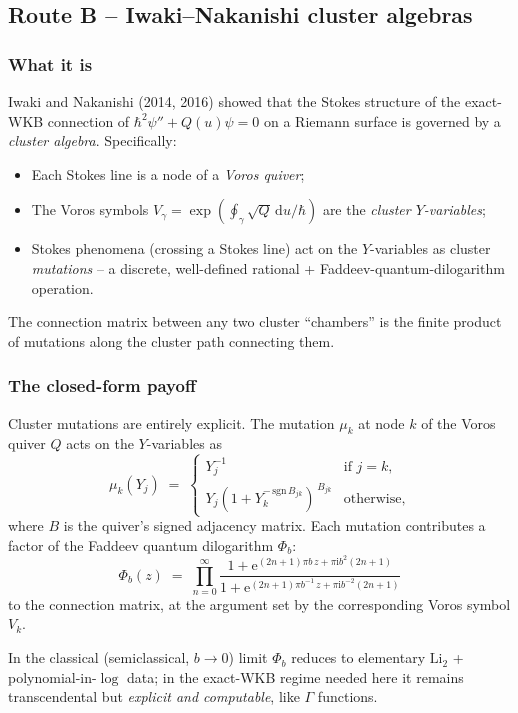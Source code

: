 \documentclass[11pt]{article}
\newcommand{\ii}{\mathrm i}\newcommand{\dd}{\mathrm d}
\begin{document}
\subsection{Route B -- Iwaki--Nakanishi cluster algebras}
\label{sec:route-b}

\subsubsection*{What it is}

Iwaki and Nakanishi (2014, 2016) showed that the Stokes structure of
the exact-WKB connection of $\hbar^2\psi'' + Q(u)\psi = 0$ on a
Riemann surface is governed by a \emph{cluster algebra}. Specifically:
\begin{itemize}
 \item Each Stokes line is a node of a \emph{Voros quiver};
 \item The Voros symbols
 $V_\gamma = \exp(\oint_\gamma\sqrt Q\,\dd u / \hbar)$ are the
 \emph{cluster $Y$-variables};
 \item Stokes phenomena (crossing a Stokes line) act on the
 $Y$-variables as cluster \emph{mutations} -- a discrete,
 well-defined rational + Faddeev-quantum-dilogarithm operation.
\end{itemize}
The connection matrix between any two cluster ``chambers'' is the
finite product of mutations along the cluster path connecting them.

\subsubsection*{The closed-form payoff}

Cluster mutations are entirely explicit. The mutation $\mu_k$ at node
$k$ of the Voros quiver $Q$ acts on the $Y$-variables as
\[
\mu_k(Y_j) \;=\; \begin{cases}
  Y_j^{-1} & \text{if } j=k,\\
  Y_j (1 + Y_k^{-\,\mathrm{sgn}\,B_{jk}})^{\,B_{jk}} & \text{otherwise},
\end{cases}
\]
where $B$ is the quiver's signed adjacency matrix. Each mutation contributes
a factor of the Faddeev quantum dilogarithm $\Phi_b$:
\[
\Phi_b(z) \;=\; \prod_{n=0}^\infty
\frac{1 + \mathrm e^{(2n+1)\pi b\,z + \pi\ii b^2(2n+1)}}
     {1 + \mathrm e^{(2n+1)\pi b^{-1}\,z + \pi\ii b^{-2}(2n+1)}}
\]
to the connection matrix, at the argument set by the corresponding
Voros symbol $V_k$.

In the classical (semiclassical, $b\to 0$) limit $\Phi_b$ reduces to
elementary $\mathrm{Li}_2$ + polynomial-in-$\log$ data; in the
exact-WKB regime needed here it remains transcendental but
\emph{explicit and computable}, like $\Gamma$ functions.
\end{document}
